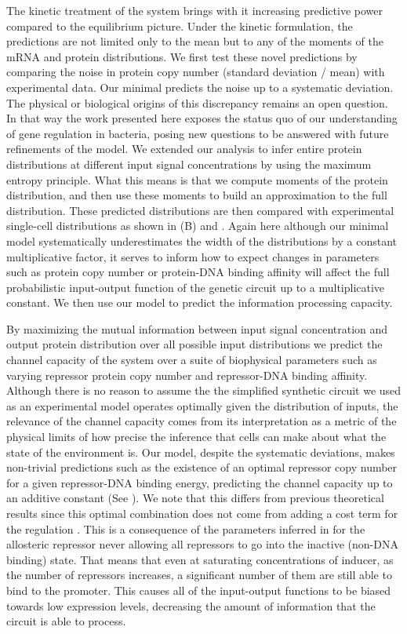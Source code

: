 The kinetic treatment of the system brings with it increasing predictive power
compared to the equilibrium picture. Under the kinetic formulation, the
predictions are not limited only to the mean but to any of the moments of the
mRNA and protein distributions. We first test these novel predictions by
comparing the noise in protein copy number (standard deviation / mean) with
experimental data. Our minimal predicts the noise up to a systematic deviation.
The physical or biological origins of this discrepancy remains an open
question. In that way the work presented here exposes the status quo of our
understanding of gene regulation in bacteria, posing new questions to be
answered with future refinements of the model. We extended our analysis to
infer entire protein distributions at different input signal concentrations by
using the maximum entropy principle. What this means is that we compute moments
of the protein distribution, and then use these moments to build an
approximation to the full distribution. These predicted distributions are then
compared with experimental single-cell distributions as shown in
(B) and . Again here although our minimal
model systematically underestimates the width of the distributions by a
constant multiplicative factor, it serves to inform how to expect changes in
parameters such as protein copy number or protein-DNA binding affinity will
affect the full probabilistic input-output function of the genetic circuit up
to a multiplicative constant. We then use our model to predict the information
processing capacity.

By maximizing the mutual information between input signal concentration and
output protein distribution over all possible input distributions we predict
the channel capacity of the system over a suite of biophysical parameters such
as varying repressor protein copy number and repressor-DNA binding affinity.
Although there is no reason to assume the the simplified synthetic circuit we
used as an experimental model operates optimally given the distribution of
inputs, the relevance of the channel capacity comes from its interpretation as
a metric of the physical limits of how precise the inference that cells can
make about what the state of the environment is. Our model, despite the
systematic deviations, makes non-trivial predictions such as the existence of
an optimal repressor copy number for a given repressor-DNA binding energy,
predicting the channel capacity up to an additive constant (See
). We note that this differs from previous theoretical
results since this optimal combination does not come from adding a cost term
for the regulation \cite{Tkacik2011}. This is a consequence of the parameters
inferred in \cite{Razo-Mejia2018} for the allosteric repressor never allowing
all repressors to go into the inactive (non-DNA binding) state. That means that
even at saturating concentrations of inducer, as the number of repressors
increases, a significant number of them are still able to bind to the promoter.
This causes all of the input-output functions to be biased towards low
expression levels, decreasing the amount of information that the circuit is
able to process.

